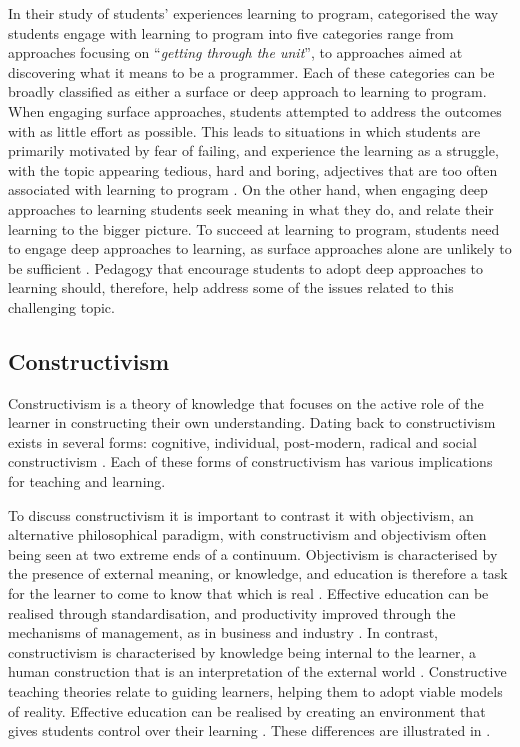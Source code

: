 In their study of students' experiences learning to program, \citet{Bruce:2003} categorised the way students engage with learning to program into five categories range from approaches focusing on ``\emph{getting through the unit}'', to approaches aimed at discovering what it means to be a programmer. Each of these categories can be broadly classified as either a surface or deep approach to learning to program. When engaging surface approaches, students attempted to address the outcomes with as little effort as possible. This leads to situations in which students are primarily motivated by fear of failing, and experience the learning as a struggle, with the topic appearing tedious, hard and boring, adjectives that are too often associated with learning to program \cite{McGettrick:2005}. On the other hand, when engaging deep approaches to learning students seek meaning in what they do, and relate their learning to the bigger picture. To succeed at learning to program, students need to engage deep approaches to learning, as surface approaches alone are unlikely to be sufficient \cite{Bruce:2003}. Pedagogy that encourage students to adopt deep approaches to learning should, therefore, help address some of the issues related to this challenging topic.



\subsection{Constructivism} %
\label{sub:constructivism}

Constructivism is a theory of knowledge that focuses on the active role of the learner in constructing their own understanding. Dating back to \citet{Piaget:1950} constructivism exists in several forms: cognitive, individual, post-modern, radical and social constructivism \cite{Phillips:1995,Steffe:1995}. Each of these forms of constructivism has various implications for teaching and learning. 

To discuss constructivism it is important to contrast it with objectivism, an alternative philosophical paradigm, with constructivism and objectivism often being seen at two extreme ends of a continuum. Objectivism is characterised by the presence of external meaning, or knowledge, and education is therefore a task for the learner to come to know that which is real \cite{Jonassen:1991,Vrasidas:2000}. Effective education can be realised through standardisation, and productivity improved through the mechanisms of management, as in business and industry \cite{Tyler:1969,Vrasidas:2000}. In contrast, constructivism is characterised by knowledge being internal to the learner, a human construction that is an interpretation of the external world \cite{Jonassen:1991,Vrasidas:2000}. Constructive teaching theories relate to guiding learners, helping them to adopt viable models of reality. Effective education can be realised by creating an environment that gives students control over their learning \cite{Vrasidas:2000}. These differences are illustrated in .

